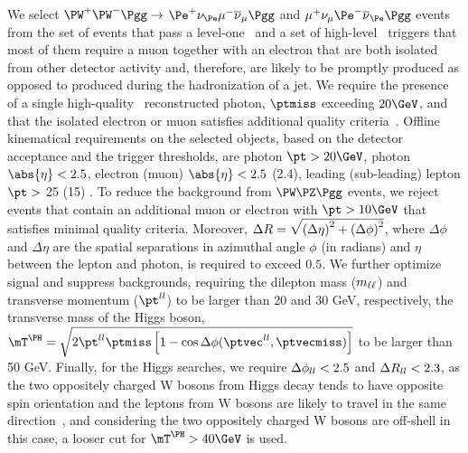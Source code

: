 \documentclass[11pt,twoside,a4paper,cmspaper]{cms-tdr}
\begin{document}
We select $\PW^+\PW^-\Pgg\to$ $\Pe^+\nu_{\Pe}\mu^-\overline{\nu}_{\mu}\Pgg$ and $\mu^+\nu_{\mu}\Pe^-\overline{\nu}_{\Pe}\Pgg$ events from the set of events that pass a level-one~\cite{Sirunyan:2020zal} and a set of  high-level~\cite{Khachatryan:2016bia} triggers that most of them require a muon together with an electron that are both isolated from other detector activity and, therefore, are likely to be promptly produced as opposed to produced during the hadronization of a jet. We require the presence of a single high-quality~\cite{CMS:EGM-14-001} reconstructed photon, $\ptmiss$ exceeding $20\GeV$, and that the isolated electron or muon satisfies additional quality criteria~\cite{Sirunyan:2018,Khachatryan:2015hwa}. Offline kinematical requirements on the selected objects, based on the detector acceptance and the trigger thresholds, are photon $\pt > 20\GeV$, photon $\abs{\eta} < 2.5$, electron (muon) $\abs{\eta}< 2.5$ (2.4), leading (sub-leading) lepton $\pt > $ 25 (15) \GeV. To reduce the background from $\PW\PZ\Pgg$ events, we reject events that contain an additional muon or electron with $\pt > 10\GeV$ that satisfies minimal quality criteria. Moreover, $\Delta R = \sqrt{\smash[b]{\left(\Delta\eta\right)^2 + \left(\Delta\phi\right)^2}}$, where $\Delta \phi$ and $\Delta \eta$ are the spatial separations in azimuthal angle $\phi$ (in radians) and $\eta$ between the lepton and photon, is required to exceed $0.5$. We further optimize signal and suppress backgrounds, requiring the dilepton mass ($m_{\ell\ell}$) and transverse momentum ($\ptll$) to be larger than 20 and 30 GeV, respectively, the transverse mass of the Higgs boson, $\mTH = \sqrt{2 \ptll \ptmiss \left[1 - \cos\Delta\phi(\ptvecll, \ptvecmiss)\right]}$ to be larger than 50 GeV. Finally, for the Higgs searches, we require $\Delta\phi_{ll}<2.5$ and $\Delta R_{ll}<2.3$, as the two oppositely charged W bosons from Higgs decay tends to have opposite spin orientation and the leptons from W bosons are likely to travel in the same direction~\cite{Dittmar:1996ss}, and considering the two oppositely charged W bosons are off-shell in this case, a looser cut for $\mTH > 40\GeV$ is used.
\end{document}
